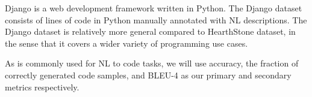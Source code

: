 \documentclass{IEEEtran}
\begin{document}
    Django is a web development framework written in Python. The Django dataset consists of 
    lines of code in Python manually annotated with NL descriptions. The Django dataset is 
    relatively more general compared to HearthStone dataset, in the sense that it covers a wider 
    variety of programming use cases.

    As is commonly used for NL to code tasks, we will use accuracy, the fraction of correctly 
    generated code samples, and BLEU-4 as our primary and secondary metrics respectively.

    
    
\end{document}
